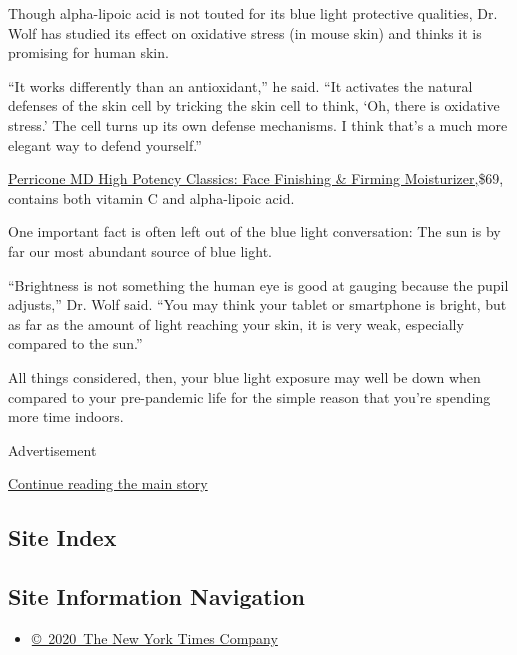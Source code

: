 Though alpha-lipoic acid is not touted for its blue light protective
qualities, Dr. Wolf has studied its effect on oxidative stress (in mouse
skin) and thinks it is promising for human skin.

``It works differently than an antioxidant,'' he said. ``It activates
the natural defenses of the skin cell by tricking the skin cell to
think, `Oh, there is oxidative stress.' The cell turns up its own
defense mechanisms. I think that's a much more elegant way to defend
yourself.''

\href{https://www.perriconemd.com/products/face-finishing-firming-moisturizer-51090023}{Perricone
MD High Potency Classics: Face Finishing \& Firming Moisturizer,}\$69,
contains both vitamin C and alpha-lipoic acid.

One important fact is often left out of the blue light conversation: The
sun is by far our most abundant source of blue light.

``Brightness is not something the human eye is good at gauging because
the pupil adjusts,'' Dr. Wolf said. ``You may think your tablet or
smartphone is bright, but as far as the amount of light reaching your
skin, it is very weak, especially compared to the sun.''

All things considered, then, your blue light exposure may well be down
when compared to your pre-pandemic life for the simple reason that
you're spending more time indoors.

Advertisement

\protect\hyperlink{after-bottom}{Continue reading the main story}

\hypertarget{site-index}{%
\subsection{Site Index}\label{site-index}}

\hypertarget{site-information-navigation}{%
\subsection{Site Information
Navigation}\label{site-information-navigation}}

\begin{itemize}
\tightlist
\item
  \href{https://help.nytimes3xbfgragh.onion/hc/en-us/articles/115014792127-Copyright-notice}{©~2020~The
  New York Times Company}
\end{itemize}


